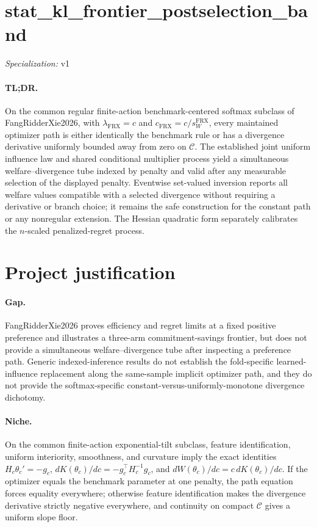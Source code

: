 \documentclass{article}
\begin{document}
\sloppy

\section*{stat\_\allowbreak{}kl\_\allowbreak{}frontier\_\allowbreak{}postselection\_\allowbreak{}band}

\noindent\textit{Specialization:} v1\par

\paragraph{TL;DR.} On the common regular finite-action benchmark-centered softmax subclass of FangRidderXie2026, with \(\lambda_{\mathrm{FRX}}=c\) and \(c_{\mathrm{FRX}}=c/s_W^{\mathrm{FRX}}\), every maintained optimizer path is either identically the benchmark rule or has a divergence derivative uniformly bounded away from zero on \(\mathcal C\). The established joint uniform influence law and shared conditional multiplier process yield a simultaneous welfare--divergence tube indexed by penalty and valid after any measurable selection of the displayed penalty. Eventwise set-valued inversion reports all welfare values compatible with a selected divergence without requiring a derivative or branch choice; it remains the safe construction for the constant path or any nonregular extension. The Hessian quadratic form separately calibrates the \(n\)-scaled penalized-regret process.

\section{Project justification}

\paragraph{Gap.} FangRidderXie2026 proves efficiency and regret limits at a fixed positive preference and illustrates a three-arm commitment-savings frontier, but does not provide a simultaneous welfare--divergence tube after inspecting a preference path. Generic indexed-inference results do not establish the fold-specific learned-influence replacement along the same-sample implicit optimizer path, and they do not provide the softmax-specific constant-versus-uniformly-monotone divergence dichotomy.

\paragraph{Niche.} On the common finite-action exponential-tilt subclass, feature identification, uniform interiority, smoothness, and curvature imply the exact identities \(H_c\theta_c'=-g_c\), \(dK(\theta_c)/dc=-g_c^\top H_c^{-1}g_c\), and \(dW(\theta_c)/dc=c\,dK(\theta_c)/dc\). If the optimizer equals the benchmark parameter at one penalty, the path equation forces equality everywhere; otherwise feature identification makes the divergence derivative strictly negative everywhere, and continuity on compact \(\mathcal C\) gives a uniform slope floor.
\end{document}
